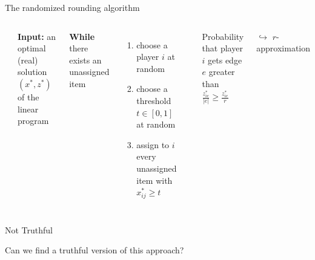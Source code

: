 \documentclass[aspectratio=169]{beamer}
\begin{document}
\begin{frame}{The randomized rounding algorithm}
    \begin{columns}
        \hrule
        \vspace{.1cm}
        \textbf{Input:} an optimal (real) solution \((x^*, z^*)\) of the linear program

        \vspace{.65cm}
        \textbf{While} there exists an unassigned item
        \begin{enumerate}
            \item choose a player \(i\) at random
            \item choose a threshold \(t \in [0, 1]\) at random
            \item assign to \(i\) every unassigned item with \(x_{ij}^* \geqslant t\)
        \end{enumerate}
        \hrule

        Probability that player \(i\) gets edge \(e\) greater than \(\frac{z_{ie}^*}{|e|} \geqslant \frac{z_{ie}^*}{r}\)

        \(\hookrightarrow\) \(r\)-approximation

    \end{columns}
    \pause
    \begin{center}
        \alert<2>{Not Truthful}
    \end{center}
\end{frame}

\begin{frame}[standout]
    Can we find a \alert{truthful version} of this approach?
\end{frame}
\end{document}
